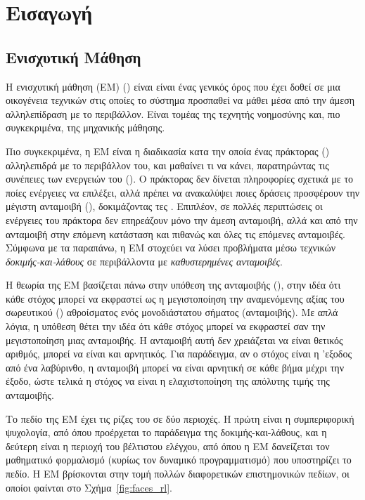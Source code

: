 \chapter{Εισαγωγή}

\section{Ενισχυτική Μάθηση}
Η ενισχυτική μάθηση (ΕΜ) () είναι είναι ένας γενικός όρος που έχει
δοθεί σε μια οικογένεια τεχνικών στις οποίες το σύστημα προσπαθεί να μάθει μέσα από την άμεση αλληλεπίδραση
με το περιβάλλον.\cite{aigreek} Είναι τομέας της τεχνητής νοημοσύνης και, πιο συγκεκριμένα, της μηχανικής μάθησης.

Πιο συγκεκριμένα, η ΕΜ είναι η διαδικασία κατα την οποία ένας πράκτορας () αλληλεπιδρά με το περιβάλλον του,
και μαθαίνει τι να κάνει, παρατηρώντας τις συνέπειες των ενεργειών του ().
Ο πράκτορας δεν δίνεται πληροφορίες σχετικά με το ποίες ενέργειες να επιλέξει, αλλά πρέπει να
ανακαλύψει ποιες δράσεις προσφέρουν την μέγιστη ανταμοιβή (), δοκιμάζοντας τες \cite{rlbook}.
Επιπλέον, σε πολλές περιπτώσεις οι ενέργειες του πράκτορα δεν επηρεάζουν μόνο την άμεση ανταμοιβή,
αλλά και από την ανταμοιβή στην επόμενη κατάσταση και πιθανώς και όλες τις επόμενες ανταμοιβές.
Σύμφωνα με τα παραπάνω, η ΕΜ στοχεύει να λύσει προβλήματα μέσω τεχνικών
\textit{δοκιμής-και-λάθους } σε περιβάλλοντα με \textit{καθυστερημένες ανταμοιβές}.

Η θεωρία της ΕΜ βασίζεται πάνω στην υπόθεση της ανταμοιβής (), στην ιδέα ότι κάθε στόχος μπορεί να
εκφραστεί ως η μεγιστοποίηση την αναμενόμενης αξίας του σωρευτικού () αθροίσματος ενός μονοδιάστατου σήματος
(ανταμοιβής). Με απλά λόγια, η υπόθεση θέτει την ιδέα ότι κάθε στόχος μπορεί να εκφραστεί σαν την μεγιστοποίηση μιας ανταμοιβής.
Η ανταμοιβή αυτή δεν χρειάζεται να είναι θετικός αριθμός, μπορεί να είναι και αρνητικός. Για παράδειγμα, αν ο στόχος είναι η
'εξοδος από ένα λαβύρινθο, η ανταμοιβή μπορεί να είναι αρνητική σε κάθε βήμα μέχρι την έξοδο, ώστε τελικά η στόχος να είναι η
ελαχιστοποίηση της απόλυτης τιμής της ανταμοιβής.

Το πεδίο της ΕΜ έχει τις ρίζες του σε δύο περιοχές. Η πρώτη είναι η συμπεριφορική ψυχολογία, από όπου προέρχεται το
παράδειγμα της δοκιμής-και-λάθους, και η δεύτερη είναι η περιοχή του βέλτιστου ελέγχου, από όπου η ΕΜ δανείζεται
τον μαθηματικό φορμαλισμό (κυρίως τον δυναμικό προγραμματισμό) που υποστηρίζει το πεδίο. H ΕΜ
βρίσκονται στην τομή πολλών διαφορετικών επιστημονικών πεδίων, οι οποίοι φαίνται στο Σχήμα~\ref{fig:faces_rl}\cite{silver2015}.

